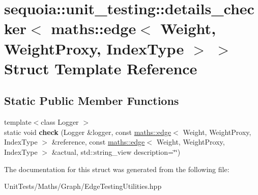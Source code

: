 \hypertarget{structsequoia_1_1unit__testing_1_1details__checker_3_01maths_1_1edge_3_01_weight_00_01_weight_proxy_00_01_index_type_01_4_01_4}{}\section{sequoia\+::unit\+\_\+testing\+::details\+\_\+checker$<$ maths\+::edge$<$ Weight, Weight\+Proxy, Index\+Type $>$ $>$ Struct Template Reference}
\label{structsequoia_1_1unit__testing_1_1details__checker_3_01maths_1_1edge_3_01_weight_00_01_weight_proxy_00_01_index_type_01_4_01_4}
\subsection*{Static Public Member Functions}
\begin{DoxyCompactItemize}
\item 
\mbox{\label{structsequoia_1_1unit__testing_1_1details__checker_3_01maths_1_1edge_3_01_weight_00_01_weight_proxy_00_01_index_type_01_4_01_4_ad7389924efa19f2a962556ec79215a73}} 
{\footnotesize template$<$class Logger $>$ }\\static void {\bfseries check} (Logger \&logger, const \mbox{\hyperlink{classsequoia_1_1maths_1_1edge}{maths\+::edge}}$<$ Weight, Weight\+Proxy, Index\+Type $>$ \&reference, const \mbox{\hyperlink{classsequoia_1_1maths_1_1edge}{maths\+::edge}}$<$ Weight, Weight\+Proxy, Index\+Type $>$ \&actual, std\+::string\+\_\+view description=\char`\"{}\char`\"{})
\end{DoxyCompactItemize}


The documentation for this struct was generated from the following file\+:\begin{DoxyCompactItemize}
\item 
Unit\+Tests/\+Maths/\+Graph/Edge\+Testing\+Utilities.\+hpp\end{DoxyCompactItemize}

